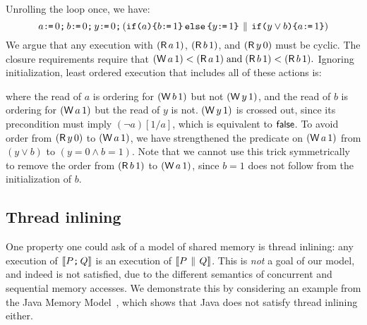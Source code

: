 Unrolling the loop once, we have:
\begin{displaymath}
   a\texttt{:}\mkern-1mu\texttt{=}\, 0\texttt{;}\,\allowbreak
   b\texttt{:}\mkern-1mu\texttt{=}\, 0\texttt{;}\,\allowbreak
   y\texttt{:}\mkern-1mu\texttt{=}\, 0\texttt{;}\,\allowbreak
  (\texttt{if}\allowbreak\texttt{(}a\texttt{)}\allowbreak\texttt{\{} b\texttt{:}\mkern-1mu\texttt{=}\, 1\texttt{\}}\,\allowbreak\texttt{else}\allowbreak\,\texttt{\{} y\texttt{:}\mkern-1mu\texttt{=}\, 1\texttt{\}} 
  \,\mathbin{\|}\,
  \texttt{if}\allowbreak\texttt{(}y\lor b\texttt{)}\allowbreak\texttt{\{} a\texttt{:}\mkern-1mu\texttt{=}\, 1\texttt{\}})
\end{displaymath}
We argue that any execution with $(\DR{a}{1})$, $(\DR{b}{1})$, and
$(\DR{y}{0})$ must be cyclic.  The closure requirements require that
\begin{math}
  (\DW{a}{1})\lt(\DR{a}{1})
  \;\text{and}\;
  (\DR{b}{1})\lt(\DR{b}{1}).
\end{math}
Ignoring initialization, least ordered execution that includes all of these
actions is:
\begin{tikzdisplay}[node distance=1em]
\end{tikzdisplay}
where the read of $a$ is ordering for $(\DW{b}{1})$ but
not $(\DW{y}{1})$, and the read of $b$ is ordering for $(\DW{a}{1})$ but the
read of $y$ is not.  $(\DW{y}{1})$ is crossed out, since its
precondition must imply $(\lnot a)[1/a]$, which is equivalent to $\mathsf{false}$.
To avoid order from $(\DR{y}{0})$ to $(\DW{a}{1})$, we
have strengthened the predicate on $(\DW{a}{1})$ from $(y\lor b)$ to
$(y=0\land b=1)$.  Note that we cannot use this trick symmetrically to remove
the order from $(\DR{b}{1})$ to $(\DW{a}{1})$, since $b=1$ does not follow
from the initialization of $b$.


\subsection{Thread inlining}

One property one could ask of a model of shared memory is thread
inlining: any execution of $\llbracket P\texttt{;}\,\allowbreak Q\rrbracket$ is an execution of $\llbracket P
  \,\mathbin{\|}\, Q\rrbracket$. This is \emph{not} a goal of our model, and indeed is not
satisfied, due to the different semantics of concurrent and sequential
memory accesses. We demonstrate this by considering an example from
the Java Memory Model~\cite{Manson:2005:JMM:1047659.1040336}, which shows that Java does not
satisfy thread inlining either.

